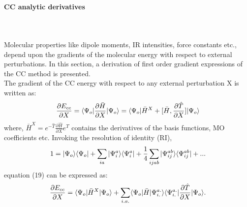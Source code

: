 \paragraph{CC analytic derivatives} ~ \\\\
Molecular properties like dipole
moments, IR intensities, force constants etc., depend upon the gradients of the
molecular energy with respect to external perturbations. 
In this section, a derivation of first order gradient expressions of the CC method is presented.\\
The gradient of the CC energy with respect to any external perturbation 
X is written as:
\begin{equation}
\frac{\partial{E_{cc}}}{\partial X} = \langle \Psi_o |\frac{\partial{\bar H}}{\partial X}| \Psi_o \rangle = \langle \Psi_o |{\bar{H}}^X + \lbrack\bar H , \frac{\partial{\hat T}}{\partial X}\rbrack| \Psi_o \rangle 
\end{equation}
where, $ {\bar{H}}^X =  e^{-\hat{T}}\frac{\partial{\hat H}}{\partial X}e^{\hat{T}}$ contains the 
derivatives of the basis functions, MO coefficients etc. Invoking the 
resolution of identity (RI),
\begin{equation}
 1 = | \Psi_o \rangle\langle \Psi_o | + \sum_{ia}| {\Psi}^a_i \rangle\langle {\Psi}^a_i | + \frac{1}{4}\sum_{ijab}| {\Psi}^{ab}_{ij} \rangle\langle {\Psi}^{ab}_{ij} | + ...
\end{equation}
equation (19) can be expressed as:
\begin{equation}
\frac{\partial{E_{cc}}}{\partial X} = \langle \Psi_o |{\bar{H}}^X| \Psi_o \rangle + \sum_{i.a.}\langle \Psi_o |\bar{H}| {\Psi}^{a.}_{i.} \rangle\langle {\Psi}^{a.}_{i.} |\frac{\partial{\hat T}}{\partial X}| \Psi_o \rangle.
\end{equation}
